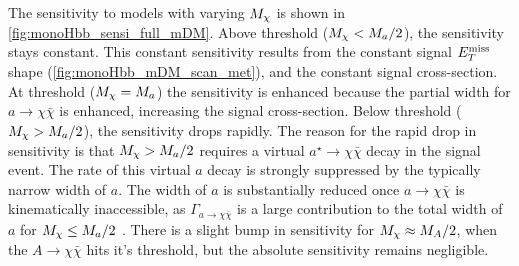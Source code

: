 The sensitivity to models with varying $M_{\chi}$ is shown in  \autoref{fig:monoHbb_sensi_full_mDM}.
Above threshold ($M_{\chi} < M_{a}/2$), the sensitivity stays constant. 
This constant sensitivity results from the constant  signal $E_T^\mathrm{miss}$ shape (\autoref{fig:monoHbb_mDM_scan_met}), and the constant signal cross-section.
At threshold ($M_{\chi} = M_{a}$) the sensitivity is enhanced because the partial width for $ a \rightarrow \chi \bar{\chi} $ is enhanced, 
increasing the signal cross-section.
Below threshold ($M_{\chi} > M_{a}/2$), the sensitivity drops rapidly. 
The reason for the rapid drop in sensitivity is that $M_{\chi} > M_{a}/2$ requires a virtual $a^{\star} \rightarrow \chi\bar{\chi}$ decay in the  signal event. 
The rate of this virtual $a$ decay is strongly suppressed by the typically  narrow width of  $a$. 
The width of $a$ is substantially reduced once $a\rightarrow \chi \bar{\chi}$ is kinematically inaccessible, 
as $\Gamma_{a\rightarrow \chi \bar{\chi}}$ is a large contribution to the total width of $a$ for $M_{\chi} \leq M_{a}/2$ \cite{Bauer:2017ota}.
There is a slight bump in sensitivity for $M_{\chi} \approx M_{A}/2$, when the $A\rightarrow \chi\bar{\chi}$ hits it's threshold,
but the absolute sensitivity remains negligible.
